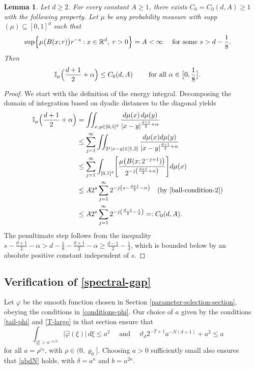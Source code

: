 \documentclass[a4paper,11pt]{amsart}
\newtheorem{lem}[thm]{\bf Lemma}
\numberwithin{equation}{section}
\begin{document}
\begin{lem} \label{ball-energy-lemma}
Let $d \geq 2$. For every constant $A \geq 1$, there exists $C_0 = C_0(d, A) \geq 1$ with the following property. Let $\mu$ be any probability measure with supp$(\mu) \subseteq [0,1]^d$ such that  
\begin{equation} \label{ball-condition-2}
\sup \Bigl\{ \mu \bigl(B(x;r) \bigr) r^{-s} : x \in \mathbb R^d, \; r > 0 \Bigr\} = A < \infty \quad \text{ for some $s > d - \frac{1}{8}$.}  
\end{equation}    
Then 
\begin{equation} 
\mathbb I_{\mu}\Bigl(\frac{d+1}{2} + \alpha\Bigr) \leq C_0(d, A) \qquad \text{ for all $\alpha \in \bigl[0, \frac18 \bigr]$}.   
\end{equation} 
\end{lem} 
\begin{proof}
We start with the definition of the energy integral. Decomposing the domain of integration based on dyadic distances to the diagonal yields 
\begin{align*}
\mathbb I_{\mu}\Bigl(\frac{d+1}{2} + \alpha\Bigr)  &= \iint_{x, y \in [0,1]^d} \frac{d\mu(x) \, d\mu(y)}{|x-y|^{\frac{d+1}{2} + \alpha}} \\
&\leq \sum_{j=1}^{\infty} \iint_{2^j|x-y| \in [1, 2]} \frac{d \mu(x) d\mu(y)}{|x-y|^{\frac{d+1}{2} + \alpha}} \\ 
&\leq  \sum_{j=1}^{\infty} \int_{[0,1]^d} \Biggl[ \frac{\mu \bigl( B(x;2^{-j+1})\bigr)}{2^{-j \left(\frac{d+1}{2} + \alpha \right)}} \Biggr] d\mu(x) \\ 
&\leq A2^{s} \sum_{j=1}^{\infty} 2^{-j \left(s - \frac{d+1}{2} - \alpha \right)} \quad (\text{by \eqref{ball-condition-2}})\\ 
&\leq A 2^s \sum_{j=1}^{\infty} 2^{-j \left(\frac{d-1}{2} - \frac14\right)} =: C_0(d, A).  
\end{align*}
The penultimate step follows from the inequality $s - \frac{d+1}{2} - \alpha > d - \frac{1}{8}  - \frac{d+1}{2} - \alpha \geq \frac{d-1}{2} - \frac{1}{4}$,  which is bounded below by an absolute positive constant independent of $s$.  
\end{proof}
\subsection{Verification of \eqref{spectral-gap}} \label{spectral-gap-verification} 
 Let $\varphi$ be the smooth function chosen in Section \ref{parameter-selection-section}, obeying the conditions in \eqref{conditions-phi}. Our choice of $a$ given by the conditions \eqref{tail-phi} and \eqref{T-large} in that section ensure that 
 \begin{equation}  \int_{|\xi| > a^{-\kappa/2}} \bigl| \widehat{\varphi}(\xi) \bigr| \, d\xi \leq a^2 \quad \text{ and } \quad \vartheta_d 2^{-T+1} a^{-N(d+1)} + a^2 \leq a \label{phi-and-a} \end{equation} 
for all $a = \rho^{c_0}$, with $\rho \in (0, \varrho_0]$. Choosing $a > 0$ sufficiently small also ensures that \eqref{abdN} holds, with $\delta = a^{\kappa}$ and $b = a^{2\kappa}$. 
\end{document}
